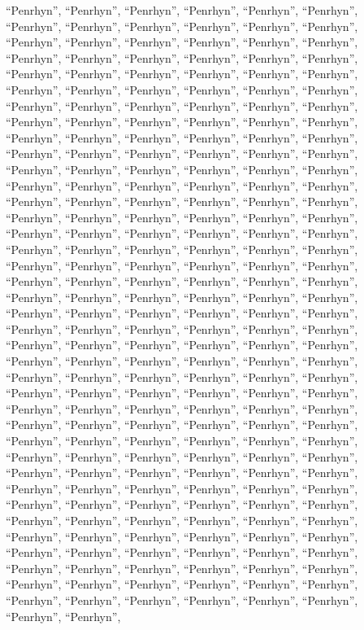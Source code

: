 \documentclass[
  ,man]{apa6}
\begin{document}
``Penrhyn'', ``Penrhyn'', ``Penrhyn'', ``Penrhyn'', ``Penrhyn'', ``Penrhyn'', ``Penrhyn'', ``Penrhyn'', ``Penrhyn'', ``Penrhyn'', ``Penrhyn'', ``Penrhyn'', ``Penrhyn'', ``Penrhyn'', ``Penrhyn'', ``Penrhyn'', ``Penrhyn'', ``Penrhyn'', ``Penrhyn'', ``Penrhyn'', ``Penrhyn'', ``Penrhyn'', ``Penrhyn'', ``Penrhyn'', ``Penrhyn'', ``Penrhyn'', ``Penrhyn'', ``Penrhyn'', ``Penrhyn'', ``Penrhyn'', ``Penrhyn'', ``Penrhyn'', ``Penrhyn'', ``Penrhyn'', ``Penrhyn'', ``Penrhyn'', ``Penrhyn'', ``Penrhyn'', ``Penrhyn'', ``Penrhyn'', ``Penrhyn'', ``Penrhyn'', ``Penrhyn'', ``Penrhyn'', ``Penrhyn'', ``Penrhyn'',
``Penrhyn'', ``Penrhyn'', ``Penrhyn'', ``Penrhyn'', ``Penrhyn'', ``Penrhyn'', ``Penrhyn'', ``Penrhyn'', ``Penrhyn'', ``Penrhyn'', ``Penrhyn'', ``Penrhyn'', ``Penrhyn'', ``Penrhyn'', ``Penrhyn'', ``Penrhyn'', ``Penrhyn'', ``Penrhyn'', ``Penrhyn'', ``Penrhyn'', ``Penrhyn'', ``Penrhyn'', ``Penrhyn'', ``Penrhyn'', ``Penrhyn'', ``Penrhyn'', ``Penrhyn'', ``Penrhyn'', ``Penrhyn'', ``Penrhyn'', ``Penrhyn'', ``Penrhyn'', ``Penrhyn'', ``Penrhyn'', ``Penrhyn'', ``Penrhyn'', ``Penrhyn'', ``Penrhyn'', ``Penrhyn'', ``Penrhyn'', ``Penrhyn'', ``Penrhyn'', ``Penrhyn'', ``Penrhyn'', ``Penrhyn'', ``Penrhyn'',
``Penrhyn'', ``Penrhyn'', ``Penrhyn'', ``Penrhyn'', ``Penrhyn'', ``Penrhyn'', ``Penrhyn'', ``Penrhyn'', ``Penrhyn'', ``Penrhyn'', ``Penrhyn'', ``Penrhyn'', ``Penrhyn'', ``Penrhyn'', ``Penrhyn'', ``Penrhyn'', ``Penrhyn'', ``Penrhyn'', ``Penrhyn'', ``Penrhyn'', ``Penrhyn'', ``Penrhyn'', ``Penrhyn'', ``Penrhyn'', ``Penrhyn'', ``Penrhyn'', ``Penrhyn'', ``Penrhyn'', ``Penrhyn'', ``Penrhyn'', ``Penrhyn'', ``Penrhyn'', ``Penrhyn'', ``Penrhyn'', ``Penrhyn'', ``Penrhyn'', ``Penrhyn'', ``Penrhyn'', ``Penrhyn'', ``Penrhyn'', ``Penrhyn'', ``Penrhyn'', ``Penrhyn'', ``Penrhyn'', ``Penrhyn'', ``Penrhyn'',
``Penrhyn'', ``Penrhyn'', ``Penrhyn'', ``Penrhyn'', ``Penrhyn'', ``Penrhyn'', ``Penrhyn'', ``Penrhyn'', ``Penrhyn'', ``Penrhyn'', ``Penrhyn'', ``Penrhyn'', ``Penrhyn'', ``Penrhyn'', ``Penrhyn'', ``Penrhyn'', ``Penrhyn'', ``Penrhyn'', ``Penrhyn'', ``Penrhyn'', ``Penrhyn'', ``Penrhyn'', ``Penrhyn'', ``Penrhyn'', ``Penrhyn'', ``Penrhyn'', ``Penrhyn'', ``Penrhyn'', ``Penrhyn'', ``Penrhyn'', ``Penrhyn'', ``Penrhyn'', ``Penrhyn'', ``Penrhyn'', ``Penrhyn'', ``Penrhyn'', ``Penrhyn'', ``Penrhyn'', ``Penrhyn'', ``Penrhyn'', ``Penrhyn'', ``Penrhyn'', ``Penrhyn'', ``Penrhyn'', ``Penrhyn'', ``Penrhyn'',
``Penrhyn'', ``Penrhyn'', ``Penrhyn'', ``Penrhyn'', ``Penrhyn'', ``Penrhyn'', ``Penrhyn'', ``Penrhyn'', ``Penrhyn'', ``Penrhyn'', ``Penrhyn'', ``Penrhyn'', ``Penrhyn'', ``Penrhyn'', ``Penrhyn'', ``Penrhyn'', ``Penrhyn'', ``Penrhyn'', ``Penrhyn'', ``Penrhyn'', ``Penrhyn'', ``Penrhyn'', ``Penrhyn'', ``Penrhyn'', ``Penrhyn'', ``Penrhyn'', ``Penrhyn'', ``Penrhyn'', ``Penrhyn'', ``Penrhyn'', ``Penrhyn'', ``Penrhyn'', ``Penrhyn'', ``Penrhyn'', ``Penrhyn'', ``Penrhyn'', ``Penrhyn'', ``Penrhyn'', ``Penrhyn'', ``Penrhyn'', ``Penrhyn'', ``Penrhyn'', ``Penrhyn'', ``Penrhyn'', ``Penrhyn'', ``Penrhyn'',
\end{document}
